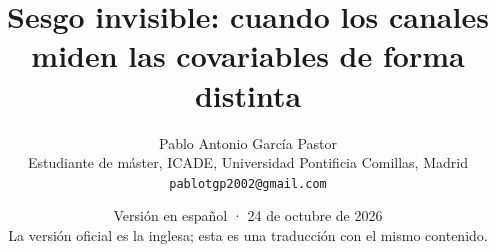 \documentclass[11pt,a4paper]{article}
\title{Sesgo invisible: cuando los canales miden las covariables de forma distinta}
\author{Pablo Antonio García Pastor\\ \small Estudiante de máster, ICADE, Universidad Pontificia Comillas, Madrid\\ \small\texttt{pablotgp2002@gmail.com}}
\date{Versión en español · 24 de octubre de 2026\\[0.3em]\small La versión oficial es la inglesa; esta es una traducción con el mismo contenido.}
\theoremstyle{plain}
\theoremstyle{definition}
\begin{document}
\maketitle

\begin{abstract}

\end{abstract}














\appendix




\end{document}
